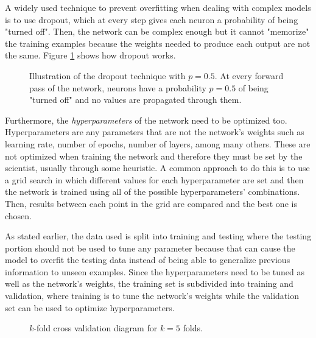 A widely used technique to prevent overfitting when dealing with complex models is to use dropout, which at every step gives each neuron a probability of being "turned off". Then, the network can be complex enough but it cannot "memorize" the training examples because the weights needed to produce each output are not the same. Figure \ref{fig:dropout} shows how dropout works.


\begin{figure}
    \centering
    \resizebox{\linewidth}{!}{
    
    }
    \caption[Illustration of the dropout technique with $p=0.5$]{Illustration of the dropout technique with $p=0.5$. At every forward pass of the network, neurons have a probability $p=0.5$ of being "turned off" and no values are propagated through them.}
   \label{fig:dropout}
\end{figure}


Furthermore, the \textit{hyperparameters} of the network need to be optimized too. Hyperparameters are any parameters that are not the network's weights such as learning rate, number of epochs, number of layers, among many others. These are not optimized when training the network and therefore they must be set by the scientist, usually through some heuristic. A common approach to do this is to use a grid search in which different values for each hyperparameter are set and then the network is trained using all of the possible hyperparameters' combinations. Then, results between each point in the grid are compared and the best one is chosen.

As stated earlier, the data used is split into training and testing where the testing portion should not be used to tune any parameter because that can cause the model to overfit the testing data instead of being able to generalize previous information to unseen examples. Since the hyperparameters need to be tuned as well as the network's weights, the training set is subdivided into training and validation, where training is to tune the network's weights while the validation set can be used to optimize hyperparameters.

\begin{figure}[h]
    \centering
        \caption[$k$-fold cross validation diagram]{$k$-fold cross validation diagram for $k=5$ folds.}
    \label{fig:kfold}
\end{figure}

